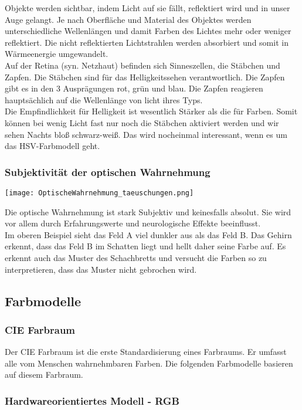 Objekte werden sichtbar, indem Licht auf sie fällt, reflektiert wird und in unser Auge gelangt. Je nach Oberfläche und Material des Objektes werden unterschiedliche Wellenlängen und damit Farben des Lichtes mehr oder weniger reflektiert. Die nicht reflektierten Lichtstrahlen werden absorbiert und somit in Wärmeenergie umgewandelt.\\

Auf der Retina (syn. Netzhaut) befinden sich Sinneszellen, die Stäbchen und Zapfen. Die Stäbchen sind für das Helligkeitssehen verantwortlich. Die Zapfen gibt es in den 3 Ausprägungen rot, grün und blau. Die Zapfen reagieren hauptsächlich auf die Wellenlänge von licht ihres Typs.\\
Die Empfindlichkeit für Helligkeit ist wesentlich Stärker als die für Farben. Somit können bei wenig Licht fast nur noch die Stäbchen aktiviert werden und wir sehen Nachts bloß schwarz-weiß. Das wird nocheinmal interessant, wenn es um das HSV-Farbmodell geht.

\subsubsection*{Subjektivität der optischen Wahrnehmung}

\texttt{[image: OptischeWahrnehmung\_taeuschungen.png]}

Die optische Wahrnehmung ist stark Subjektiv und keinesfalls absolut. Sie wird vor allem durch Erfahrungswerte und neurologische Effekte beeinflusst.\\
Im oberen Beispiel sieht das Feld A viel dunkler aus als das Feld B. Das Gehirn erkennt, dass das Feld B im Schatten liegt und hellt daher seine Farbe auf. Es erkennt auch das Muster des Schachbretts und versucht die Farben so zu interpretieren, dass das Muster nicht gebrochen wird.

\subsection{Farbmodelle}

\subsubsection{CIE Farbraum}
Der CIE Farbraum ist die erste Standardisierung eines Farbraums. Er umfasst alle vom Menschen wahrnehmbaren Farben. Die folgenden Farbmodelle basieren auf diesem Farbraum.

\subsubsection{Hardwareorientiertes Modell - RGB}
\label{sec:RGB}


